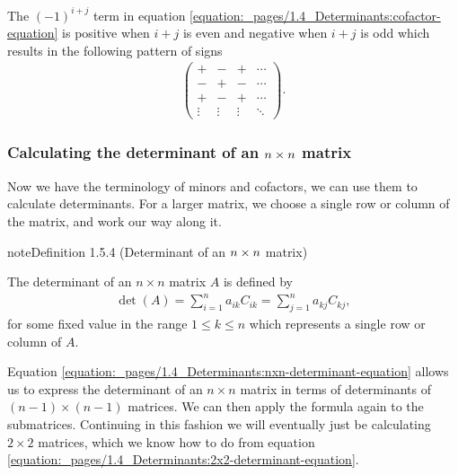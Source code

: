 \documentclass[letterpaper,10pt,english]{jupyterBook}
\begin{document}
\sphinxAtStartPar
The \((-1)^{i+j}\) term in equation \eqref{equation:_pages/1.4_Determinants:cofactor-equation} is positive when \(i + j\) is even and negative when \(i + j\) is odd which results in the following pattern of signs
\begin{equation*}
\begin{split} \begin{pmatrix}
        + & - & + & \cdots \\
        - & + & - & \cdots \\
        + & - & + & \cdots \\
        \vdots & \vdots & \vdots & \ddots
\end{pmatrix}. \end{split}
\end{equation*}

\subsubsection{Calculating the determinant of an \protect\(n \times n\protect\) matrix}
\label{\detokenize{_pages/1.4_Determinants:calculating-the-determinant-of-an-n-times-n-matrix}}
\sphinxAtStartPar
Now we have the terminology of minors and cofactors, we can use them to calculate determinants. For a larger matrix, we choose a single row or column of the matrix, and work our way along it.
\label{_pages/1.4_Determinants:nxn-determinant-definition}
\begin{sphinxadmonition}{note}{Definition 1.5.4 (Determinant of an \protect\(n \times n\protect\) matrix)}



\sphinxAtStartPar
The determinant of an \(n\times n\) matrix \(A\) is defined by
\begin{equation}\label{equation:_pages/1.4_Determinants:nxn-determinant-equation}
\begin{split} \det(A) = \sum_{i=1}^n a_{ik} C_{ik} = \sum_{j=1}^n a_{kj} C_{kj}, \end{split}
\end{equation}
\sphinxAtStartPar
for some fixed value in the range \(1 \leq k \leq n\) which represents a single row or column of \(A\).
\end{sphinxadmonition}

\sphinxAtStartPar
Equation \eqref{equation:_pages/1.4_Determinants:nxn-determinant-equation} allows us to express the determinant of an \(n \times n\) matrix in terms of determinants of \((n-1) \times (n-1)\) matrices. We can then apply the formula again to the sub\sphinxhyphen{}matrices. Continuing in this fashion we will eventually just be calculating \(2\times 2\) matrices, which we know how to do from equation \eqref{equation:_pages/1.4_Determinants:2x2-determinant-equation}.
\end{document}
